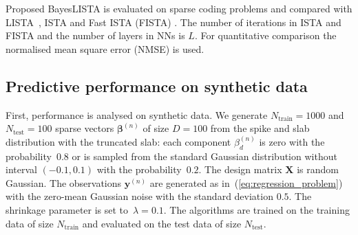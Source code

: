 \documentclass{article}
\begin{document}
  Proposed BayesLISTA is evaluated on sparse coding problems and compared with LISTA~\cite{gregor2010learning}, ISTA \cite{daubechies2004iterative} and Fast ISTA (FISTA) \cite{beck2009fast}. The number of iterations in ISTA and FISTA  and the number of layers in NNs is $L$. For quantitative comparison the normalised mean square error (NMSE) is used. %
  
  \subsection{Predictive performance on synthetic data}
  First, performance is analysed on synthetic data. We generate $N_\text{train}=1000$ and $N_{\text{test}} = 100$ sparse vectors $\boldsymbol\beta^{(n)}$ of size $D = 100$  from the spike and slab distribution with the truncated slab: each component $\beta^{(n)}_{d}$ is zero with the probability~$0.8$ or is sampled from the standard Gaussian distribution without interval $(-0.1, 0.1)$ with the probability~$0.2$. The design matrix $\mathbf{X}$ is random Gaussian.  The observations $\mathbf{y}^{(n)}$ are generated as in~(\ref{eq:regression_problem}) with the zero-mean Gaussian noise with the standard deviation $0.5$. The shrinkage parameter is set to~$\lambda = 0.1$. The algorithms are trained on the training data of size $N_\text{train}$ and evaluated on the test data of size $N_{\text{test}}$.
  
\end{document}
